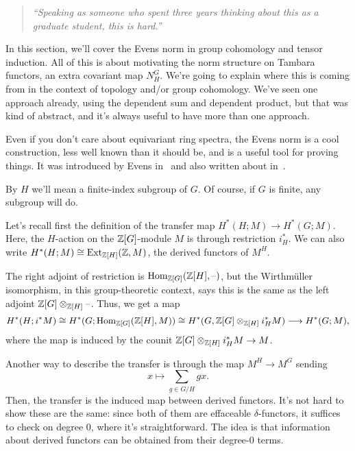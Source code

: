 \begin{quote}\textit{
	``Speaking as someone who spent three years thinking about this as a graduate student, this is hard.''
}\end{quote}
\label{evenssec}
In this section, we'll cover the Evens norm in group cohomology and tensor induction.  All of this is about
motivating the norm structure on Tambara functors, an extra covariant map $N_H^G$. We're going to explain where
this is coming from in the context of topology and/or group cohomology. We've seen one approach already, using the
dependent sum and dependent product, but that was kind of abstract, and it's always useful to have more than one
approach.

Even if you don't care about equivariant ring spectra, the Evens norm is a cool construction, less well known than
it should be, and is a useful tool for proving things. It was introduced by Evens in~ and also written
about in~.

By $H$ we'll mean a finite-index subgroup of $G$. Of course, if $G$ is finite, any subgroup will do.

Let's recall first the definition of the transfer map $H^*(H;M)\to H^*(G;M)$. Here, the $H$-action on the
$\mathbb Z[G]$-module $M$ is through restriction $i_H^*$. We can also write $H^*(H;M)\cong\operatorname{Ext}_{\mathbb Z[H]}(\mathbb Z, M)$, the
derived functors of $M^H$.

The right adjoint of restriction is $\operatorname{Hom}_{\mathbb Z[G]}(\mathbb Z[H], \text{--})$, but the Wirthmüller isomorphism, in this
group-theoretic context, says this is the same as the left adjoint $\mathbb Z[G]\otimes_{\mathbb Z[H]}\text{--}$. Thus, we get a
map
\[H^*(H; i^*M)\cong H^*(G; \operatorname{Hom}_{\mathbb Z[G]}(\mathbb Z[H], M))\cong H^*(G, \mathbb Z[G]\otimes_{\mathbb Z[H]} i_H^*M)\longrightarrow
H^*(G;M),\]
where the map is induced by the counit $\mathbb Z[G]\otimes_{\mathbb Z[H]} i_H^*M\to M$.

Another way to describe the transfer is through the map $M^H\to M^G$ sending
\begin{equation}
\label{addtransfer}
x\mapsto \sum_{g\in G/H} gx.
\end{equation}
Then, the transfer is the induced map between derived functors. It's not hard to show these are the same: since
both of them are effaceable $\delta$-functors, it suffices to check on degree $0$, where it's straightforward. The
idea is that information about derived functors can be obtained from their degree-$0$ terms.

